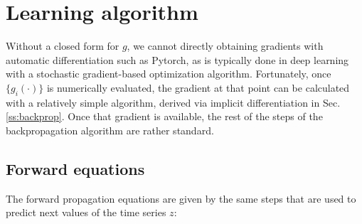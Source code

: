 


\section{Learning algorithm}

Without a closed form for $g$, we cannot directly obtaining gradients with automatic differentiation such as Pytorch,%
as is typically done in deep learning with a stochastic gradient-based optimization algorithm. Fortunately, once $\{g_i(\cdot)\}$ is numerically evaluated, the gradient at that point can be calculated with a relatively simple algorithm, derived via implicit differentiation in Sec. \ref{ss:backprop}. Once that gradient is available, the rest of the steps of the backpropagation algorithm are rather standard.

\subsection{Forward equations}
The forward propagation equations are given by the same steps that are used to predict next values of the time series $z$:

